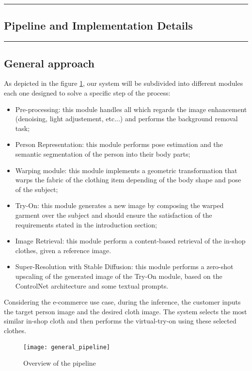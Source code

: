 {\color{gray}\hrule}
\begin{center}
\section{Pipeline and Implementation Details}
\end{center}
{\color{gray}\hrule}

\hfill

\subsection{General approach}

As depicted in the figure \ref{fig:general_pipeline}, our system will be subdivided into different modules each one designed to solve a specific step of the process:
\begin{itemize}[noitemsep]
\item Pre-processing: this module handles all which regards the image enhancement (denoising, light adjustement, etc...) and performs the background removal task;
\item Person Representation: this module performs pose estimation and the semantic segmentation of the person into their body parts;
\item Warping module: this module implements a geometric transformation that warps the fabric of the clothing item depending of the body shape and pose of the subject;
\item Try-On: this module generates a new image by composing the warped garment over the subject and should ensure the satisfaction of the requirements stated in the introduction section;
\item Image Retrieval: this module perform a content-based retrieval of the in-shop clothes, given a reference image.
\item Super-Resolution with Stable Diffusion: this module performs a zero-shot upscaling of the generated image of the Try-On module, based on the ControlNet architecture and some textual prompts.
\end{itemize}

Considering the e-commerce use case, during the inference, the customer inputs the target person image and the desired cloth image. The system selects the most similar in-shop cloth and then performs the virtual-try-on using these selected clothes.

\begin{figure}[h]
\centering
\texttt{[image: general\_pipeline]}
\caption{Overview of the pipeline}
\label{fig:general_pipeline}
\end{figure}




